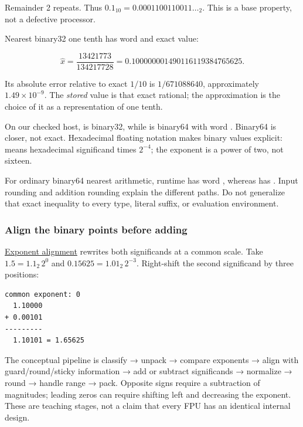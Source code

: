 Remainder 2 repeats. Thus \(0.1_{10}=0.0001100110011\ldots_2\). This is a base property, not a defective processor.

Nearest binary32 one tenth has word  and exact value:

\[
\widehat{x}=\frac{13421773}{134217728}
=0.100000001490116119384765625.
\]

Its absolute error relative to exact \(1/10\) is \(1/671088640\), approximately \(1.49\times10^{-9}\). The \emph{stored} value is that exact rational; the approximation is the choice of it as a representation of one tenth.

On our checked host,  is binary32, while  is binary64 with word . Binary64 is closer, not exact. Hexadecimal floating notation makes binary values explicit:  means hexadecimal significand times \(2^{-4}\); the  exponent is a power of two, not sixteen.

For ordinary binary64 nearest arithmetic, runtime  has word , whereas  has . Input rounding and addition rounding explain the different paths. Do not generalize that exact inequality to every type, literal suffix, or evaluation environment.

\subsubsection{Align the binary points before adding}\label{01-foundations-i-ch001-align-the-binary-points-before-adding}

\hypertarget{01-foundations-i-ch001-align-the-binary-points-before-adding}{}

\hyperref[appendix-a1b1b4580dfd]{Exponent alignment} rewrites both significands at a common scale. Take \(1.5=1.1_2\,2^0\) and \(0.15625=1.01_2\,2^{-3}\). Right-shift the second significand by three positions:

\begin{verbatim}
common exponent: 0
  1.10000
+ 0.00101
---------
  1.10101 = 1.65625
\end{verbatim}

The conceptual pipeline is classify → unpack → compare exponents → align with guard/round/sticky information → add or subtract significands → normalize → round → handle range → pack. Opposite signs require a subtraction of magnitudes; leading zeros can require shifting left and decreasing the exponent. These are teaching stages, not a claim that every FPU has an identical internal design.

